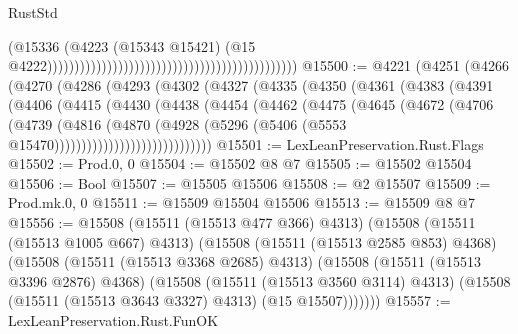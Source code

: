 \begin{lexlean}{RustStd}
\begin{coremodule}
                                                                                          (@15336
                                                                                            (@4223
                                                                                              (@15343
                                                                                                @15421)
                                                                                              (@15
                                                                                                @4222))))))))))))))))))))))))))))))))))))))))))))))
@15500 := @4221
    (@4251
      (@4266
        (@4270
          (@4286
            (@4293
              (@4302
                (@4327
                  (@4335
                    (@4350
                      (@4361
                        (@4383
                          (@4391
                            (@4406
                              (@4415
                                (@4430
                                  (@4438
                                    (@4454
                                      (@4462
                                        (@4475
                                          (@4645
                                            (@4672
                                              (@4706
                                                (@4739
                                                  (@4816
                                                    (@4870
                                                      (@4928
                                                        (@5296
                                                          (@5406
                                                            (@5553
                                                              @15470)))))))))))))))))))))))))))))
@15501 := LexLeanPreservation.Rust.Flags
@15502 := Prod.{0, 0}
@15504 := @15502 @8 @7
@15505 := @15502 @15504
@15506 := Bool
@15507 := @15505 @15506
@15508 := @2 @15507
@15509 := Prod.mk.{0, 0}
@15511 := @15509 @15504 @15506
@15513 := @15509 @8 @7
@15556 := @15508
    (@15511 (@15513 @477 @366) @4313)
    (@15508
      (@15511 (@15513 @1005 @667) @4313)
      (@15508
        (@15511 (@15513 @2585 @853) @4368)
        (@15508
          (@15511 (@15513 @3368 @2685) @4313)
          (@15508
            (@15511 (@15513 @3396 @2876) @4368)
            (@15508
              (@15511 (@15513 @3560 @3114) @4313)
              (@15508 (@15511 (@15513 @3643 @3327) @4313) (@15 @15507)))))))
@15557 := LexLeanPreservation.Rust.FunOK

\end{coremodule}
\end{lexlean}
